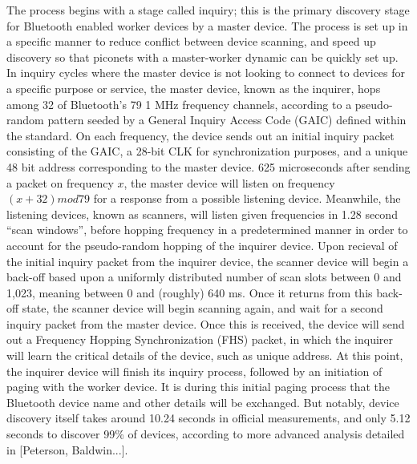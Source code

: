 The process begins with a stage called inquiry; this is the primary discovery
stage for Bluetooth enabled worker devices by a master device. The process is
set up in a specific manner to reduce conflict between device scanning, and
speed up discovery so that piconets with a master-worker dynamic can be quickly
set up. In inquiry cycles where the master device is not looking to connect to
devices for a specific purpose or service, the master device, known as the
inquirer, hops among 32 of Bluetooth's 79 1 MHz frequency channels, according to
a pseudo-random pattern seeded by a General Inquiry Access Code (GAIC) defined
within the standard. On each frequency, the device sends out an initial inquiry
packet consisting of the GAIC, a 28-bit CLK for synchronization purposes, and a
unique 48 bit address corresponding to the master device. 625 microseconds after
sending a packet on frequency $x$, the master device will listen on frequency $(x
+ 32) mod 79$ for a response from a possible listening device. Meanwhile, the
listening devices, known as scanners, will listen given frequencies in 1.28
second ``scan windows'', before hopping frequency in a predetermined manner in
order to account for the pseudo-random hopping of the inquirer device. Upon
recieval of the initial inquiry packet from the inquirer device, the scanner
device will begin a back-off based upon a uniformly distributed number of scan
slots between 0 and 1,023, meaning between 0 and (roughly) 640 ms. Once it
returns from this back-off state, the scanner device will begin scanning again,
and wait for a second inquiry packet from the master device. Once this is
received, the device will send out a Frequency Hopping Synchronization (FHS)
packet, in which the inquirer will learn the critical details of the device,
such as unique address. At this point, the inquirer device will finish its
inquiry process, followed by an initiation of paging with the worker device. It
is during this initial paging process that the Bluetooth device name and other
details will be exchanged. But notably, device discovery itself takes around
10.24 seconds in official measurements, and only 5.12 seconds to discover 99\%
of devices, according to more advanced analysis detailed in [Peterson,
Baldwin...].

